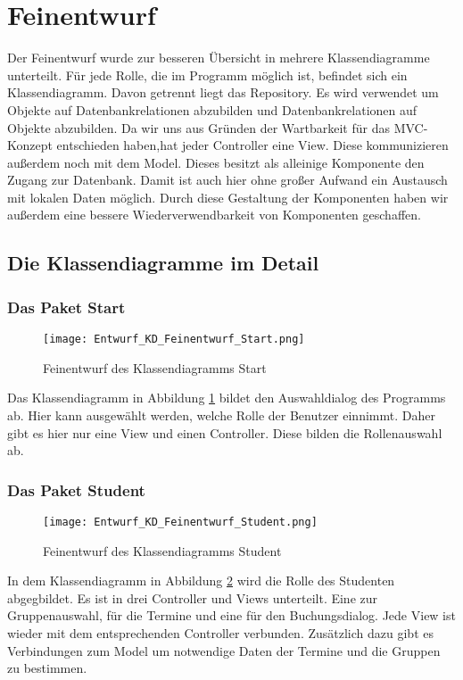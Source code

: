 \documentclass[a4paper,10pt]{article}
\begin{document}
\section{Feinentwurf}
Der Feinentwurf wurde zur besseren Übersicht in mehrere Klassendiagramme unterteilt. Für jede Rolle, die im Programm möglich ist, befindet sich ein Klassendiagramm.
Davon getrennt liegt das Repository. Es wird verwendet um Objekte auf Datenbankrelationen abzubilden und Datenbankrelationen auf Objekte abzubilden. Da wir uns aus Gründen der Wartbarkeit für das MVC-Konzept entschieden haben,hat jeder Controller eine View.
Diese kommunizieren außerdem noch mit dem Model. Dieses besitzt als alleinige Komponente den Zugang zur Datenbank. Damit ist auch hier ohne großer Aufwand ein Austausch mit lokalen Daten möglich.
Durch diese Gestaltung der Komponenten haben wir außerdem eine bessere Wiederverwendbarkeit von Komponenten geschaffen. 

 \subsection{Die Klassendiagramme im Detail}
 \subsubsection{Das Paket Start}
 
 \begin{figure}
  \texttt{[image: Entwurf\_KD\_Feinentwurf\_Start.png]}
  \label{fig:Klassendiagramm_Start}
  \caption{Feinentwurf des Klassendiagramms Start}
 \end{figure} 
 
 Das Klassendiagramm in Abbildung \ref{fig:Klassendiagramm_Start} bildet den Auswahldialog des Programms ab. Hier kann ausgewählt werden, welche Rolle der Benutzer einnimmt. 
 Daher gibt es hier nur eine View und einen Controller. Diese bilden die Rollenauswahl ab.
 \subsubsection{Das Paket Student}
 
 \begin{figure}
\texttt{[image: Entwurf\_KD\_Feinentwurf\_Student.png]}
\label{fig:Klassendiagramm_Student}
\caption{Feinentwurf des Klassendiagramms Student}
 \end{figure} 

 In dem Klassendiagramm in Abbildung \ref{fig:Klassendiagramm_Student} wird die Rolle des Studenten abgegbildet. Es ist in drei Controller und Views unterteilt. Eine zur Gruppenauswahl, für die Termine und eine für den Buchungsdialog.
 Jede View ist wieder mit dem entsprechenden Controller verbunden. Zusätzlich dazu gibt es Verbindungen zum Model um notwendige Daten der Termine und die Gruppen zu bestimmen.
\end{document}

